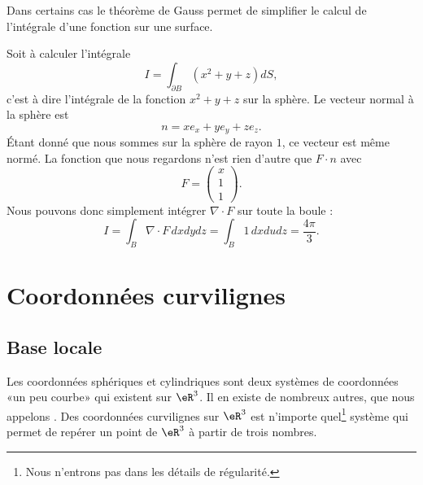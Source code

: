 Dans certains cas le théorème de Gauss permet de simplifier le calcul de l'intégrale d'une fonction sur une surface.

\begin{example}
    Soit à calculer l'intégrale
    \begin{equation}
        I=\int_{\partial B}(x^2+y+z)dS,
    \end{equation}
    c'est à dire l'intégrale de la fonction $x^2+y+z$ sur la sphère. Le vecteur normal à la sphère est
    \begin{equation}
        n=xe_x+ye_y+ze_z.
    \end{equation}
    Étant donné que nous sommes sur la sphère de rayon $1$, ce vecteur est même normé. La fonction que nous regardons n'est rien d'autre que $F\cdot n$ avec
    \begin{equation}
        F=\begin{pmatrix}
            x    \\
            1    \\
            1
        \end{pmatrix}.
    \end{equation}
    Nous pouvons donc simplement intégrer $\nabla\cdot F$ sur toute la boule :
    \begin{equation}
        I=\int_{B}\nabla\cdot F\,dxdydz=\int_B 1\,dxdudz=\frac{ 4\pi }{ 3 }.
    \end{equation}
\end{example}

\section{Coordonnées curvilignes}

\subsection{Base locale}

Les coordonnées sphériques et cylindriques sont deux systèmes de coordonnées «un peu courbe» qui existent sur $\eR^3$. Il en existe de nombreux autres, que nous appelons . Des coordonnées curvilignes sur $\eR^3$ est n'importe quel\footnote{Nous n'entrons pas dans les détails de régularité.} système qui permet de repérer un point de $\eR^3$ à partir de trois nombres.

